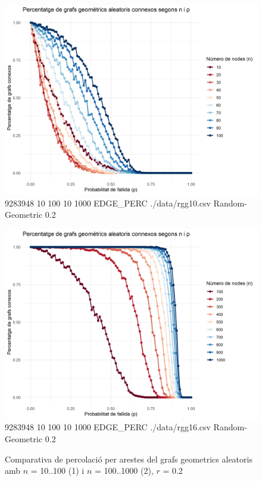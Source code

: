 \documentclass[a4paper]{article}
\begin{document}
	\begin{figure}[H]
		\centering
		\begin{minipage}{0.45\textwidth}
			\centering
			\includegraphics[width=\textwidth]{images/randomGeometric_10-100_0.2}
			\footnotesize{9283948 10 100 10 1000 EDGE\_PERC ./data/rgg10.csv Random-Geometric 0.2}
		\end{minipage}
		\hfill
		\begin{minipage}{0.45\textwidth}
			\centering
			\includegraphics[width=\textwidth]{images/randomGeometric_100-1000_0.2}
			\footnotesize{9283948 10 100 10 1000 EDGE\_PERC ./data/rgg16.csv Random-Geometric 0.2}
		\end{minipage}
		\caption{Comparativa de percolació per arestes del grafs geometrics aleatoris amb $n$ = 10..100 (1) i $n$ = 100..1000 (2), $r$ = 0.2}
		\label{fig:percolation_edges_rgg_0.2}
	\end{figure}
	
\end{document}
